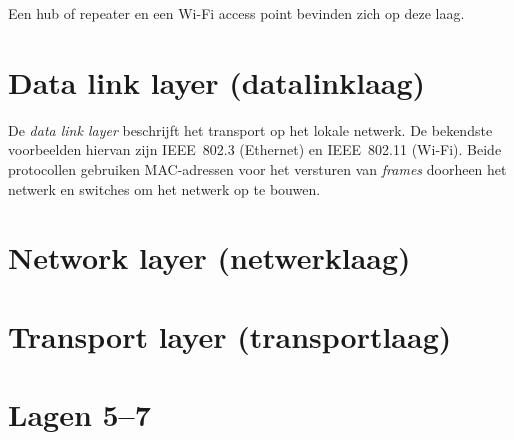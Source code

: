 \documentclass[a4paper,12pt]{memoir}
\begin{document}
Een hub of repeater en een Wi-Fi access point bevinden zich op deze laag.

\chapter{Data link layer (datalinklaag)}

De \emph{data link layer} beschrijft het transport op het lokale netwerk.
De bekendste voorbeelden hiervan zijn IEEE~802.3 (Ethernet) en IEEE~802.11 (Wi-Fi).
Beide protocollen gebruiken MAC-adressen voor het versturen van \emph{frames} doorheen het netwerk en switches om het netwerk op te bouwen.

\chapter{Network layer (netwerklaag)}
\chapter{Transport layer (transportlaag)}
\chapter{Lagen 5--7}
\end{document}
